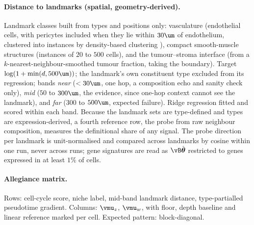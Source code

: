 \paragraph{Distance to landmarks (spatial, geometry-derived).} Landmark classes built from types and positions only: vasculature (endothelial cells, with pericytes included when they lie within $30\um$ of endothelium, clustered into instances by density-based clustering \citep{ester1996}), compact smooth-muscle structures (instances of $20$ to $500$ cells), and the tumour--stroma interface (from a $k$-nearest-neighbour-smoothed tumour fraction, taking the boundary). Target $\log(1 + \min(d, 500\um))$; the landmark's own constituent type excluded from its regression; bands \emph{near} ($< 30\um$, one hop, a composition echo and sanity check only), \emph{mid} ($50$ to $300\um$, the evidence, since one-hop context cannot see the landmark), and \emph{far} ($300$ to $500\um$, expected failure). Ridge regression fitted and scored within each band. Because the landmark sets are type-defined and types are expression-derived, a fourth reference row, the probe from raw neighbour composition, measures the definitional share of any signal. The probe direction per landmark is unit-normalised and compared across landmarks by cosine within one run, never across runs; gene signatures are read as $\vB\hat{\boldsymbol\theta}$ restricted to genes expressed in at least $1\%$ of cells. 

\paragraph{Allegiance matrix.} Rows: cell-cycle score, niche label, mid-band landmark distance, type-partialled pseudotime gradient. Columns: $\vmu_z$, $\vmu_w$, with floor, depth baseline and linear reference marked per cell. Expected pattern: block-diagonal.

